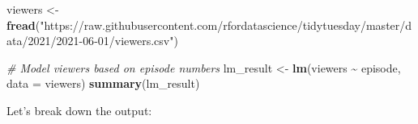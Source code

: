 \documentclass[
]{book}
\newenvironment{Shaded}{\begin{snugshade}}{\end{snugshade}}
\newcommand{\AttributeTok}[1]{\textcolor[rgb]{0.13,0.29,0.53}{#1}}
\newcommand{\CommentTok}[1]{\textcolor[rgb]{0.56,0.35,0.01}{\textit{#1}}}
\newcommand{\FunctionTok}[1]{\textcolor[rgb]{0.13,0.29,0.53}{\textbf{#1}}}
\newcommand{\NormalTok}[1]{#1}
\newcommand{\OtherTok}[1]{\textcolor[rgb]{0.56,0.35,0.01}{#1}}
\newcommand{\SpecialCharTok}[1]{\textcolor[rgb]{0.81,0.36,0.00}{\textbf{#1}}}
\newcommand{\StringTok}[1]{\textcolor[rgb]{0.31,0.60,0.02}{#1}}
\begin{document}
\begin{Shaded}
\begin{Highlighting}[]
\NormalTok{viewers }\OtherTok{\textless{}{-}} \FunctionTok{fread}\NormalTok{(}\StringTok{"https://raw.githubusercontent.com/rfordatascience/tidytuesday/master/data/2021/2021{-}06{-}01/viewers.csv"}\NormalTok{)}

\CommentTok{\# Model viewers based on episode numbers}
\NormalTok{lm\_result }\OtherTok{\textless{}{-}} \FunctionTok{lm}\NormalTok{(viewers }\SpecialCharTok{\textasciitilde{}}\NormalTok{ episode, }\AttributeTok{data =}\NormalTok{ viewers)}
\FunctionTok{summary}\NormalTok{(lm\_result)}
\end{Highlighting}
\end{Shaded}

Let's break down the output:
\end{document}
